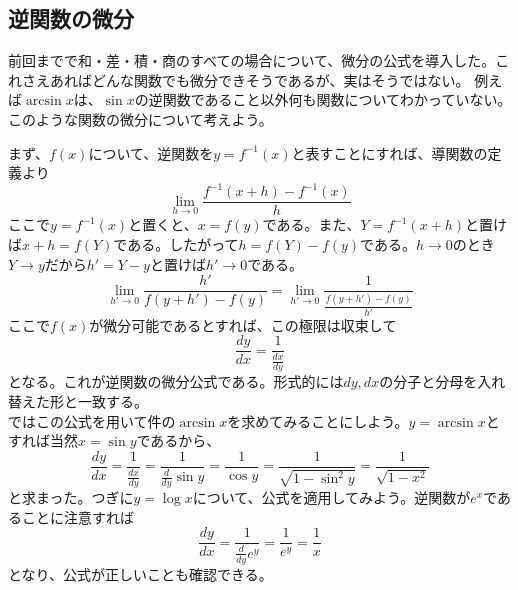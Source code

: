 \documentclass[a4j,dvipdfmx]{jsarticle}
\begin{document}
            \subsection{逆関数の微分}
                前回までで和・差・積・商のすべての場合について、微分の公式を導入した。これさえあればどんな関数でも微分できそうであるが、実はそうではない。
                例えば$\arcsin x$は、$\sin x$の逆関数であること以外何も関数についてわかっていない。このような関数の微分について考えよう。

                まず、$f(x)$について、逆関数を$y=f^{-1}(x)$と表すことにすれば、導関数の定義より
                \begin{equation}
                    \lim_{h\to 0}\frac{f^{-1}(x+h)-f^{-1}(x)}{h}
                \end{equation}
                ここで$y=f^{-1}(x)$と置くと、$x=f(y)$である。また、$Y=f^{-1}(x+h)$と置けば$x+h=f(Y)$である。したがって$h=f(Y)-f(y)$である。$h\to 0$のとき$Y\to y$だから$h'=Y-y$と置けば$h'\to 0$である。
                \begin{equation}
                    \lim_{h'\to 0}\frac{h'}{f(y+h')-f(y)}=\lim_{h'\to 0}\frac{1}{\displaystyle\frac{f(y+h')-f(y)}{h'}}
                \end{equation}
                ここで$f(x)$が微分可能であるとすれば、この極限は収束して
                \begin{equation}
                    \frac{dy}{dx}=\frac{1}{\displaystyle\frac{dx}{dy}}\label{eq:逆関数の微分公式}
                \end{equation}
                となる。これが逆関数の微分公式である。形式的には$dy,dx$の分子と分母を入れ替えた形と一致する。\\

                ではこの公式を用いて件の$\arcsin x$を求めてみることにしよう。$y=\arcsin x$とすれば当然$x=\sin y$であるから、
                \begin{equation}
                    \frac{dy}{dx}=\frac{1}{\displaystyle\frac{dx}{dy}}=\frac{1}{\displaystyle\frac{d}{dy}\sin y}=\frac{1}{\cos y}=\frac{1}{\sqrt{1-\sin^2 y}}=\frac{1}{\sqrt{1-x^2}}
                \end{equation}
                と求まった。つぎに$y=\log x$について、公式を適用してみよう。逆関数が$e^x$であることに注意すれば
                \begin{equation}
                    \frac{dy}{dx}=\frac{1}{\frac{d}{dy}e^{y}}=\frac{1}{e^y}=\frac{1}{x}
                \end{equation}
                となり、公式が正しいことも確認できる。
            \clearpage
\end{document}
